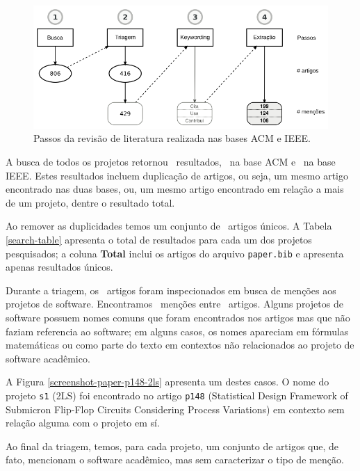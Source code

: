 \begin{figure}[h]
  \center
  \includegraphics[scale=0.35]{imagens/estudo2-revisao-literatura.png}
  \caption{Passos da revisão de literatura realizada nas bases ACM e IEEE.}
  \label{estudo2-revisao-literatura}
\end{figure}

A busca de todos os projetos retornou \SearchCount \ resultados,
\SearchACMCount \ na base ACM e \SearchIEEECount \ na base IEEE.
Estes resultados incluem duplicação de artigos, ou seja,
um mesmo artigo encontrado nas duas bases, ou, um mesmo artigo
encontrado em relação a mais de um projeto, dentre o resultado total.

Ao remover as duplicidades temos um conjunto de \SearchUniqueCount \ artigos
únicos. A Tabela \ref{search-table} apresenta o total de resultados para cada
um dos projetos pesquisados; a coluna {\bf Total} inclui os artigos do arquivo
\texttt{paper.bib} e apresenta apenas resultados únicos.



Durante a triagem, 
os \SearchUniqueCount \ artigos foram inspecionados em busca de menções aos
projetos de software. Encontramos \ScreeningCount \ menções entre
\ScreeningUniqueCount \ artigos.
Alguns projetos de software possuem nomes comuns que foram encontrados nos
artigos mas que não faziam referencia ao software; em alguns casos, os nomes
apareciam em fórmulas matemáticas ou como parte do texto em contextos não
relacionados ao projeto de software acadêmico.

A Figura \ref{screenshot-paper-p148-2ls} apresenta um destes casos. O nome do
projeto \texttt{s1} (2LS) foi encontrado no artigo \texttt{p148} (Statistical
Design Framework of Submicron Flip-Flop Circuits Considering Process
Variations) em contexto sem relação alguma com o projeto em sí.

Ao final da triagem, temos, para cada projeto, um conjunto de artigos que, de
fato, mencionam o software acadêmico, mas sem caracterizar o tipo de menção.

